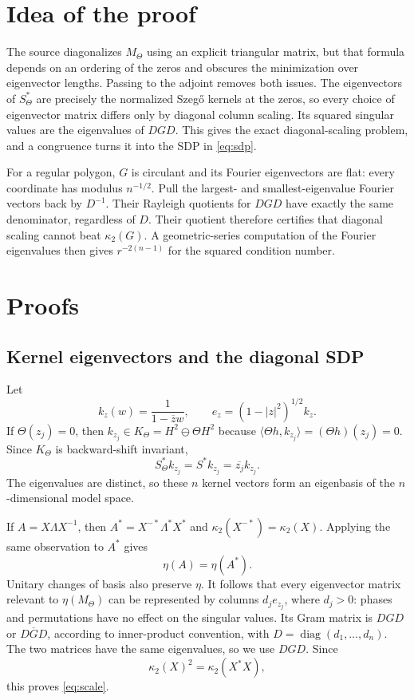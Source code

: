 \documentclass[11pt]{article}
\newcommand{\diag}{\operatorname{diag}}
\newcommand{\cond}{\kappa_2}
\begin{document}
\section{Idea of the proof}

The source diagonalizes $M_\Theta$ using an explicit triangular matrix, but
that formula depends on an ordering of the zeros and obscures the minimization
over eigenvector lengths.  Passing to the adjoint removes both issues.  The
eigenvectors of $S_\Theta^*$ are precisely the normalized Szeg\H{o} kernels at
the zeros, so every choice of eigenvector matrix differs only by diagonal
column scaling.  Its squared singular values are the eigenvalues of $DGD$.
This gives the exact diagonal-scaling problem, and a congruence turns it into
the SDP in \eqref{eq:sdp}.

For a regular polygon, $G$ is circulant and its Fourier eigenvectors are flat:
every coordinate has modulus $n^{-1/2}$.  Pull the largest- and
smallest-eigenvalue Fourier vectors back by $D^{-1}$.  Their Rayleigh
quotients for $DGD$ have exactly the same denominator, regardless of $D$.
Their quotient therefore certifies that diagonal scaling cannot beat
$\cond(G)$.  A geometric-series computation of the Fourier eigenvalues then
gives $r^{-2(n-1)}$ for the squared condition number.

\section{Proofs}

\subsection{Kernel eigenvectors and the diagonal SDP}

Let
\[
 k_z(w)=\frac1{1-\overline zw},\qquad
 e_z=(1-|z|^2)^{1/2}k_z.
\]
If $\Theta(z_j)=0$, then $k_{z_j}\in K_\Theta=H^2\ominus\Theta H^2$ because
$\langle \Theta h,k_{z_j}\rangle=(\Theta h)(z_j)=0$.  Since $K_\Theta$ is
backward-shift invariant,
\[
 S_\Theta^*k_{z_j}=S^*k_{z_j}=\overline{z_j}k_{z_j}.
\]
The eigenvalues are distinct, so these $n$ kernel vectors form an eigenbasis
of the $n$-dimensional model space.

If $A=X\Lambda X^{-1}$, then
$A^*=X^{-*}\Lambda^*X^*$ and
$\cond(X^{-*})=\cond(X)$.  Applying the same observation to $A^*$ gives
\begin{equation}\label{eq:adjoint}
 \eta(A)=\eta(A^*).
\end{equation}
Unitary changes of basis also preserve $\eta$.  It follows that every
eigenvector matrix relevant to $\eta(M_\Theta)$ can be represented by columns
$d_je_{z_j}$, where $d_j>0$: phases and permutations have no effect on the
singular values.  Its Gram matrix is $DGD$ or $D\overline GD$, according to
inner-product convention, with $D=\diag(d_1,\dots,d_n)$.  The two matrices
have the same eigenvalues, so we use $DGD$.  Since
\[
 \cond(X)^2=\cond(X^*X),
\]
this proves \eqref{eq:scale}.
\end{document}
